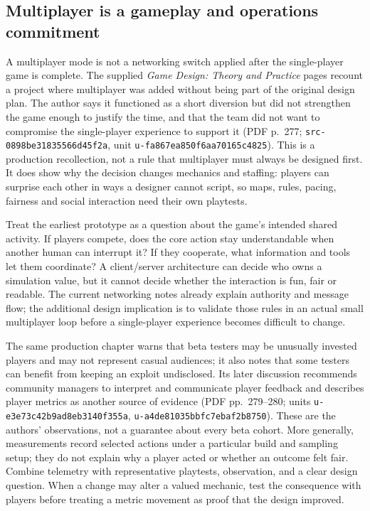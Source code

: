 \subsection{Multiplayer is a gameplay and operations commitment}\label{multiplayer-is-a-gameplay-and-operations-commitment}

A multiplayer mode is not a networking switch applied after the single-player game is complete. The supplied \emph{Game Design: Theory and Practice} pages recount a project where multiplayer was added without being part of the original design plan. The author says it functioned as a short diversion but did not strengthen the game enough to justify the time, and that the team did not want to compromise the single-player experience to support it (PDF p.~277; \texttt{src-0898be31835566d45f2a}, unit \texttt{u-fa867ea850f6aa70165c4825}). This is a production recollection, not a rule that multiplayer must always be designed first. It does show why the decision changes mechanics and staffing: players can surprise each other in ways a designer cannot script, so maps, rules, pacing, fairness and social interaction need their own playtests.

Treat the earliest prototype as a question about the game's intended shared activity. If players compete, does the core action stay understandable when another human can interrupt it? If they cooperate, what information and tools let them coordinate? A client/server architecture can decide who owns a simulation value, but it cannot decide whether the interaction is fun, fair or readable. The current networking notes already explain authority and message flow; the additional design implication is to validate those rules in an actual small multiplayer loop before a single-player experience becomes difficult to change.

The same production chapter warns that beta testers may be unusually invested players and may not represent casual audiences; it also notes that some testers can benefit from keeping an exploit undisclosed. Its later discussion recommends community managers to interpret and communicate player feedback and describes player metrics as another source of evidence (PDF pp.~279--280; units \texttt{u-e3e73c42b9ad8eb3140f355a}, \texttt{u-a4de81035bbfc7ebaf2b8750}). These are the authors' observations, not a guarantee about every beta cohort. More generally, measurements record selected actions under a particular build and sampling setup; they do not explain why a player acted or whether an outcome felt fair. Combine telemetry with representative playtests, observation, and a clear design question. When a change may alter a valued mechanic, test the consequence with players before treating a metric movement as proof that the design improved.

